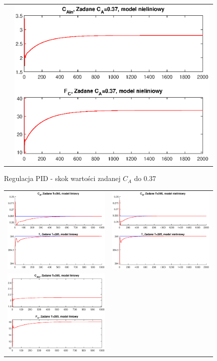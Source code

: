 \begin{figure}
\begin{tabular}{cc}
	&
	\includegraphics[width=.5\linewidth]{img/pidnlin/pidnlin3.eps}
\end{tabular}
\label{ch2:pid2}
\caption{Regulacja PID - skok wartości zadanej $C_A$ do 0.37}
\end{figure}
\newpage
\begin{figure}
\begin{tabular}{cc}
	\includegraphics[width=.5\linewidth]{img/pidlin/pidlin6.eps}
	&
	\includegraphics[width=.5\linewidth]{img/pidnlin/pidnlin6.eps}
	\\
	\includegraphics[width=.5\linewidth]{img/pidlin/pidlin5.eps}

\end{tabular}
\end{figure}
